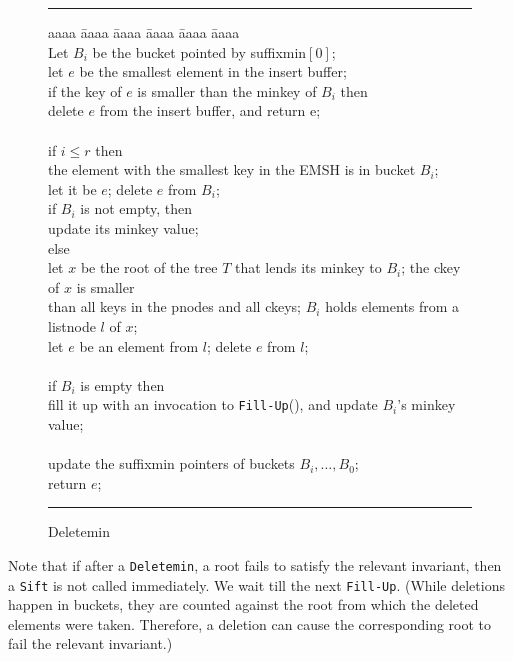 \begin{figure}
\vspace{0.2in}
\hrule
\begin{tabbing}
aaaa \= aaaa \= aaaa \= aaaa \= aaaa \= aaaa \kill \\
Let $B_i$ be the bucket pointed by suffixmin$[0]$; \\
let $e$ be the smallest element in the insert buffer; \\
if the key of $e$ is smaller than the minkey of $B_i$ then \\
	\> delete $e$ from the insert buffer, and return e; \\
\\
if $i\leq r$ then \\
	\> the element with the smallest key in the EMSH is in bucket $B_{i}$; \\
	\> let it be $e$; delete $e$ from $B_{i}$; \\
	\> if $B_{i}$ is not empty, then \\ 
	\>	\> update its minkey value; \\

else \\
	\> let $x$ be the root of the tree $T$ that lends its minkey to $B_{i}$; the ckey of $x$ is smaller \\
	\> than all keys in the pnodes and all ckeys; $B_{i}$ holds elements from a listnode $l$ of $x$;\\
	\> let $e$ be an element from $l$;  delete $e$ from $l$; \\
\\
if $B_{i}$ is empty then \\
	\> fill it up with an invocation to {\tt Fill-Up}(), and update $B_i$'s minkey value; \\
\\
update the suffixmin pointers of buckets $B_{i}, \ldots, B_{0}$; \\ 
return $e$; 
\end{tabbing}
\vspace{0.1in}
\hrule
\vspace{0.2in}
\caption{Deletemin}
\label{fig:deletemin}
\end{figure}

Note that if after a {\tt Deletemin}, a root fails to satisfy the relevant invariant,
then a {\tt Sift} is not called immediately. We wait till the next {\tt Fill-Up}.
(While deletions happen in buckets, they are counted against the root from which
the deleted elements were taken. Therefore, a deletion can cause the corresponding root
to fail the relevant invariant.)
 
